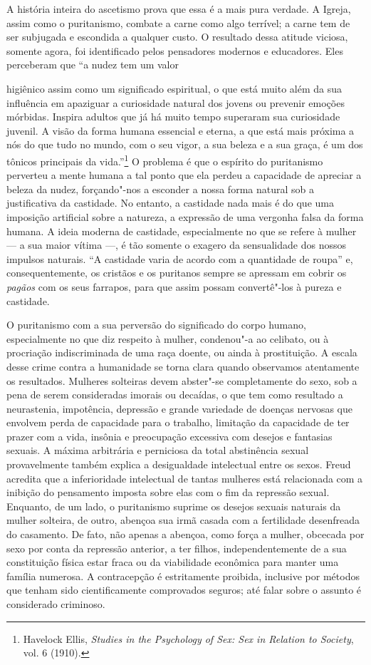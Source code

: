 A história inteira do ascetismo prova que essa é a mais pura verdade. A
Igreja, assim como o puritanismo, combate a carne como algo terrível;
a carne tem de ser subjugada e escondida a qualquer custo. O resultado
dessa atitude viciosa, somente agora, foi identificado pelos pensadores
modernos e educadores. Eles perceberam que ``a nudez tem um valor

higiênico assim como um significado espiritual, o que está muito além da sua influência em apaziguar a curiosidade natural dos jovens ou prevenir
emoções mórbidas. Inspira adultos que já há muito tempo superaram sua
curiosidade juvenil. A visão da forma humana essencial e eterna, a que
está mais próxima a nós do que tudo no mundo, com o seu vigor, a sua
beleza e a sua graça, é um dos tônicos principais da vida.''\footnote{Havelock
  Ellis, \textit{Studies in the Psychology of Sex: Sex in Relation to
  Society}, vol. 6 (1910).} O problema é que o espírito do puritanismo
perverteu a mente humana a tal ponto que ela perdeu a capacidade de
apreciar a beleza da nudez, forçando"-nos a esconder a nossa forma
natural sob a justificativa da castidade. No entanto, a castidade
nada mais é do que uma imposição artificial sobre a natureza, a
expressão de uma vergonha falsa da forma humana. A ideia moderna de
castidade, especialmente no que se refere à mulher --- a sua maior vítima
---, é tão somente o exagero da sensualidade dos nossos impulsos
naturais. ``A castidade varia de acordo com a quantidade de roupa'' e,
consequentemente, os cristãos e os puritanos sempre se apressam em
cobrir os \textit{pagãos} com os seus farrapos, para que assim possam convertê"-los à pureza e castidade.

O puritanismo com a sua perversão do significado do corpo humano,
especialmente no que diz respeito à mulher, condenou"-a ao celibato, ou à
procriação indiscriminada de uma raça doente, ou ainda à prostituição. A
escala desse crime contra a humanidade se torna clara quando observamos
atentamente os resultados. Mulheres solteiras devem abster"-se
completamente do sexo, sob a pena de serem consideradas imorais ou
decaídas, o que tem como resultado a neurastenia, impotência, depressão
e grande variedade de doenças nervosas que envolvem perda de capacidade
para o trabalho, limitação da capacidade de ter prazer com a vida,
insônia e preocupação excessiva com desejos e fantasias sexuais. A
máxima arbitrária e perniciosa da total abstinência sexual provavelmente
também explica a desigualdade intelectual entre os sexos. Freud acredita
que a inferioridade intelectual de tantas mulheres está relacionada com
a inibição do pensamento imposta sobre elas com o fim da repressão
sexual. Enquanto, de um lado, o puritanismo suprime os desejos sexuais
naturais da mulher solteira, de outro, abençoa sua irmã casada com a
fertilidade desenfreada do casamento. De fato, não apenas a abençoa,
como força a mulher, obcecada por sexo por conta da repressão anterior,
a ter filhos, independentemente de a sua constituição física estar fraca
ou da viabilidade econômica para manter uma família numerosa. A
contracepção é estritamente proibida, inclusive por métodos que tenham
sido cientificamente comprovados seguros; até falar sobre o assunto é
considerado criminoso.

